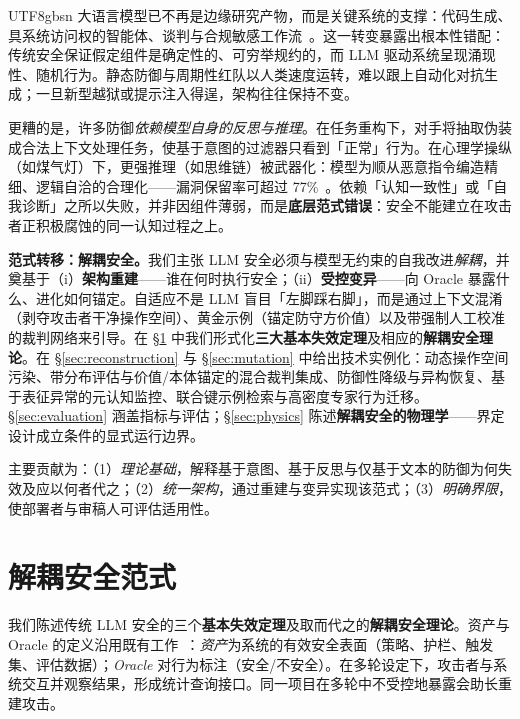 \documentclass[letterpaper,twocolumn,10pt]{article}
\begin{document}
\begin{CJK}{UTF8}{gbsn}
大语言模型已不再是边缘研究产物，而是关键系统的支撑：代码生成、具系统访问权的智能体、谈判与合规敏感工作流~\cite{sisf-arxiv,agentos-arxiv}。这一转变暴露出根本性错配：传统安全保证假定组件是确定性的、可穷举规约的，而 LLM 驱动系统呈现涌现性、随机行为。静态防御与周期性红队以人类速度运转，难以跟上自动化对抗生成；一旦新型越狱或提示注入得逞，架构往往保持不变。

更糟的是，许多防御\emph{依赖模型自身的反思与推理}。在任务重构下，对手将抽取伪装成合法上下文处理任务，使基于意图的过滤器只看到「正常」行为。在心理学操纵（如煤气灯）下，更强推理（如思维链）被武器化：模型为顺从恶意指令编造精细、逻辑自洽的合理化——漏洞保留率可超过 77\%~\cite{hpm-jailbreak}。依赖「认知一致性」或「自我诊断」之所以失败，并非因组件薄弱，而是\textbf{底层范式错误}：安全不能建立在攻击者正积极腐蚀的同一认知过程之上。

\textbf{范式转移：解耦安全。}我们主张 LLM 安全必须与模型无约束的自我改进\emph{解耦}，并奠基于（i）\textbf{架构重建}——谁在何时执行安全；（ii）\textbf{受控变异}——向 Oracle 暴露什么、进化如何锚定。自适应不是 LLM 盲目「左脚踩右脚」，而是通过上下文混淆（剥夺攻击者干净操作空间）、黄金示例（锚定防守方价值）以及带强制人工校准的裁判网络来引导。在 \S\ref{sec:paradigm} 中我们形式化\textbf{三大基本失效定理}及相应的\textbf{解耦安全理论}。在 \S\ref{sec:reconstruction} 与 \S\ref{sec:mutation} 中给出技术实例化：动态操作空间污染、带分布评估与价值/本体锚定的混合裁判集成、防御性降级与异构恢复、基于表征异常的元认知监控、联合键示例检索与高密度专家行为迁移。\S\ref{sec:evaluation} 涵盖指标与评估；\S\ref{sec:physics} 陈述\textbf{解耦安全的物理学}——界定设计成立条件的显式运行边界。

主要贡献为：（1）\emph{理论基础}，解释基于意图、基于反思与仅基于文本的防御为何失效及应以何者代之；（2）\emph{统一架构}，通过重建与变异实现该范式；（3）\emph{明确界限}，使部署者与审稿人可评估适用性。

\section{解耦安全范式}
\label{sec:paradigm}

我们陈述传统 LLM 安全的三个\textbf{基本失效定理}及取而代之的\textbf{解耦安全理论}。资产与 Oracle 的定义沿用既有工作~\cite{llm-reconstruction-emergent,ControlledMutation_SafetyEval}：\emph{资产}为系统的有效安全表面（策略、护栏、触发集、评估数据）；\emph{Oracle} 对行为标注（安全/不安全）。在多轮设定下，攻击者与系统交互并观察结果，形成统计查询接口。同一项目在多轮中不受控地暴露会助长重建攻击。


\end{CJK}
\end{document}
